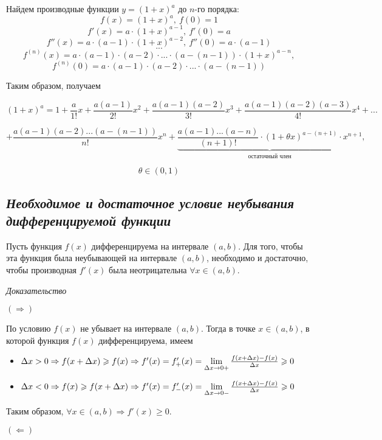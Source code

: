 Найдем производные функции $y = (1 + x)^a$ до $n$-го порядка: $$f(x) = (1+x)^a , \ f(0) = 1$$ $$f'(x)=a \cdot (1+x)^{a - 1}, \ f'(0) = a$$ $$f''(x)=a \cdot (a - 1) \cdot (1+x)^{a - 2}, \ f''(0) = a\cdot (a - 1)$$ $$...$$ $$f^{(n)}(x) = a\cdot(a - 1)\cdot(a-2)\cdot...\cdot(a - (n - 1))\cdot (1+x)^{a-n},$$ $$ f^{(n)}(0) = a\cdot(a - 1)\cdot(a-2)\cdot...\cdot(a - (n - 1))$$

Таким образом, получаем
\begin{mainQuote}

$$(1+x)^a = 1 + \frac{a}{1!}x + \frac{a(a-1)}{2!}x^2+ \frac{a(a-1)(a-2)}{3!}x^3+ \frac{a(a-1)(a-2)(a-3)}{4!}x^4+...$$

$$+\frac{a(a-1)(a-2)...(a-(n-1))}{n!}x^n + \underbrace{\frac{a(a-1)...(a -n)}{(n+1)!}\cdot (1+\theta x)^{a-(n+1)}\cdot x^{n + 1}}_{\text{остаточный \ член}},$$

$$ \theta \in (0, 1)$$
\end{mainQuote}
\subsection{\textit{Необходимое и достаточное условие неубывания дифференцируемой функции}}

Пусть функция $f(x)$ дифференцируема на интервале $(a, b)$. Для того, чтобы эта функция была неубывающей на интервале $(a, b)$, необходимо и достаточно, чтобы производная $f'(x)$ была неотрицательна $\forall x \in (a, b).$

\textit{Доказательство}

$(\Rightarrow)$

По условию $f(x)$ не убывает на интервале $(a, b)$. Тогда в точке $x \in (a, b)$, в которой функция $f(x)$ дифференцируема, имеем
\begin{itemize}

\item $\Delta x > 0\Rightarrow
f(x + \Delta x) \geqslant  f(x)
\Rightarrow f'(x) = f'_+(x) = \lim\limits_{\Delta x \to 0+ }{\Large\frac{f(x + \Delta x) - f(x)}{\Delta x}} \geqslant 0$
\item $\Delta x < 0\Rightarrow
f(x)  \geqslant f(x + \Delta x)
\Rightarrow f'(x) = f'_-(x) = \lim\limits_{\Delta x \to 0-}{\Large\frac{f(x + \Delta x) - f(x)}{\Delta x}} \geqslant 0$

\end{itemize}

Таким образом, $\forall x \in (a, b) \Rightarrow f'(x) \geqslant 0$.

$(\Leftarrow)$

